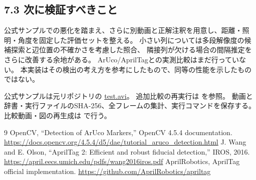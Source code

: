 \documentclass[a4paper,10pt]{ltjsarticle}
\begin{document}
\subsection*{7.3 次に検証すべきこと}
公式サンプルでの悪化を踏まえ、さらに別動画と正解注釈を用意し、距離・照明・角度を固定した評価セットを整える。
小さい列については多段解像度の候補探索と辺位置の不確かさを考慮した照合、
隣接列が欠ける場合の間隔推定をさらに改善する余地がある。
ArUco/AprilTagとの実測比較はまだ行っていない。
本実装はその検出の考え方を参考にしたもので、同等の性能を示したものではない。

公式サンプルは元リポジトリの \href{https://github.com/ShaoanWang/CylinderTag/blob/main/test.avi}{test.avi}。
追加比較の再実行は  を参照。
動画と辞書・実行ファイルのSHA-256、全フレームの集計、実行コマンドを保存する。
比較動画・図の再生成は  で行う。

\begin{thebibliography}{9}\small
{} OpenCV, ``Detection of ArUco Markers,'' OpenCV 4.5.4 documentation.
\url{https://docs.opencv.org/4.5.4/d5/dae/tutorial_aruco_detection.html}
 J. Wang and E. Olson, ``AprilTag 2: Efficient and robust fiducial detection,'' IROS, 2016.
\url{https://april.eecs.umich.edu/pdfs/wang2016iros.pdf}
 AprilRobotics, AprilTag official implementation.
\url{https://github.com/AprilRobotics/apriltag}
\end{thebibliography}
\end{document}
